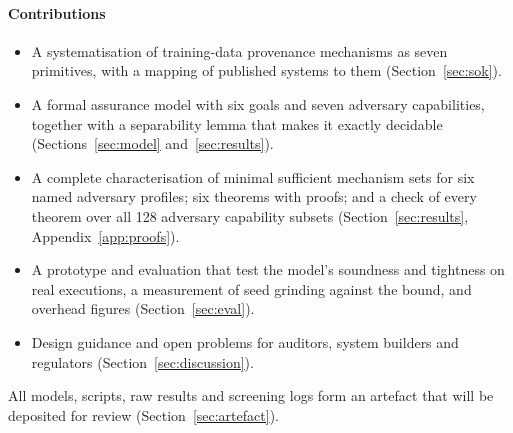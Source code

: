 \paragraph{Contributions}
\begin{itemize}
\item A systematisation of training-data provenance mechanisms as seven primitives, with a
  mapping of published systems to them (Section~\ref{sec:sok}).
\item A formal assurance model with six goals and seven adversary capabilities, together with
  a separability lemma that makes it exactly decidable (Sections~\ref{sec:model}
  and~\ref{sec:results}).
\item A complete characterisation of minimal sufficient mechanism sets for six named
  adversary profiles; six theorems with proofs; and a check of every theorem over all 128
  adversary capability subsets (Section~\ref{sec:results}, Appendix~\ref{app:proofs}).
\item A prototype and evaluation that test the model's soundness and tightness on real
  executions, a measurement of seed grinding against the bound, and overhead figures
  (Section~\ref{sec:eval}).
\item Design guidance and open problems for auditors, system builders and regulators
  (Section~\ref{sec:discussion}).
\end{itemize}
All models, scripts, raw results and screening logs form an artefact that will be deposited
for review (Section~\ref{sec:artefact}).
